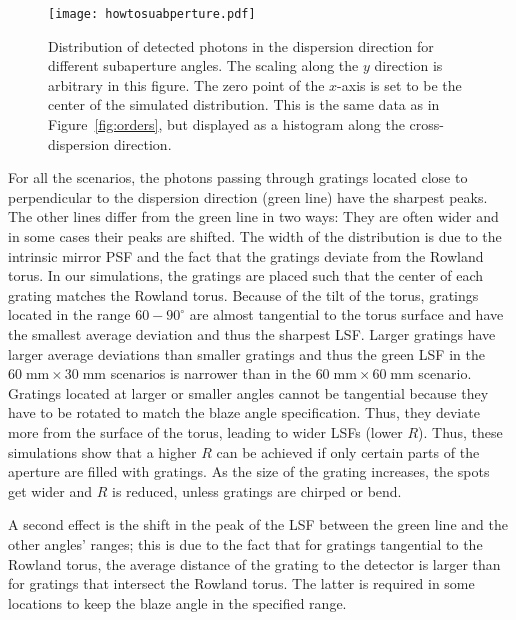 \documentclass[12pt]{spieman}  %
\begin{document}
\begin{spacing}{1}
\begin{figure} [ht]
  \begin{center}
  \texttt{[image: howtosuabperture.pdf]}
  \end{center}
  \caption {\label{fig:howtosubaperture}
    Distribution of detected photons in the dispersion direction for different subaperture angles. The scaling along the $y$ direction is arbitrary in this figure. The zero point of the $x$-axis is set to be the center of the simulated distribution. This is the same data as in Figure~\ref{fig:orders}, but displayed as a histogram along the cross-dispersion direction.
  }
\end{figure}

For all the scenarios, the photons passing through gratings located close to perpendicular to the dispersion direction (green line) have the sharpest peaks. The other lines differ from the green line in two ways: They are often wider and in some cases their peaks are shifted. The width of the distribution is due to the intrinsic mirror PSF and the fact that the gratings deviate from the Rowland torus. In our simulations, the gratings are placed such that the center of each grating matches the Rowland torus. Because of the tilt of the torus, gratings located in the range $60-90^\circ$ are almost tangential to the torus surface and have the smallest average deviation and thus the sharpest LSF. Larger gratings have larger average deviations than smaller gratings and thus the green LSF in the $60\;\mathrm{mm}\times 30\;\mathrm{mm}$ scenarios is narrower than in the $60\;\mathrm{mm}\times 60\;\mathrm{mm}$ scenario. Gratings located at larger or smaller angles cannot be tangential because they have to be rotated to match the blaze angle specification. Thus, they deviate more from the surface of the torus, leading to wider LSFs (lower $R$). Thus, these simulations show that a higher $R$ can be achieved if only certain parts of the aperture are filled with gratings. As the size of the grating increases, the spots get wider and $R$ is reduced, unless gratings are chirped or bend.

A second effect is the shift in the peak of the LSF between the green line and the other angles' ranges; this is due to the fact that for gratings tangential to the Rowland torus, the average distance of the grating to the detector is larger than for gratings that intersect the Rowland torus. The latter is required in some locations to keep the blaze angle in the specified range.



\end{spacing}
\end{document}
